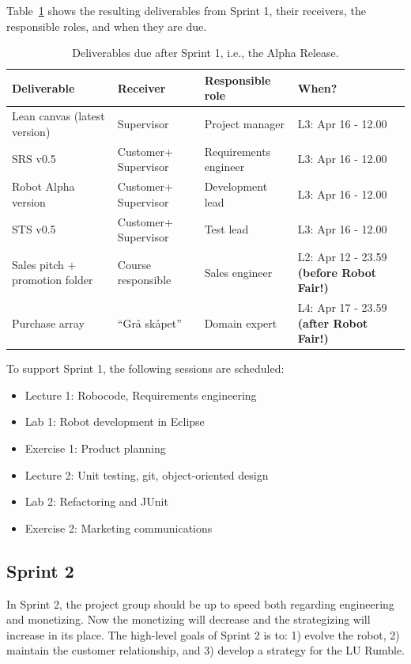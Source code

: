 \documentclass{scrreprt}
\begin{document}
Table~\ref{tab:sprint1} shows the resulting deliverables from Sprint 1, their receivers, the responsible roles, and when they are due.

\begin{table}[]
\centering
\caption{Deliverables due after Sprint 1, i.e., the Alpha Release.}
\label{tab:sprint1}
\begin{tabular}{|p{4cm}|p{2cm}|p{2.5cm}|p{4.5cm}|}
\hline
\textbf{Deliverable}           & \textbf{Receiver}   & \textbf{Responsible role} & \textbf{When?}     \\ \hline
Lean canvas (latest version)   & Supervisor          & Project manager           & L3: Apr 16 - 12.00 \\ \hline
SRS v0.5                       & Customer+ Supervisor & Requirements engineer     & L3: Apr 16 - 12.00 \\ \hline
Robot Alpha version            & Customer+ Supervisor & Development lead          & L3: Apr 16 - 12.00  \\ \hline
STS v0.5        			   & Customer+ Supervisor & Test lead                 & L3: Apr 16 - 12.00  \\ \hline
Sales pitch + promotion folder & Course responsible  & Sales engineer            & L2: Apr 12 - 23.59 \textbf{(before Robot Fair!)}\\ \hline
Purchase array                 & ``Grå skåpet''      & Domain expert             & L4: Apr 17 - 23.59 \textbf{(after Robot Fair!)} \\ \hline
\end{tabular}
\end{table}

\newpage

To support Sprint 1, the following sessions are scheduled:
\begin{itemize}
\item Lecture 1: Robocode, Requirements engineering
\item Lab 1: Robot development in Eclipse
\item Exercise 1: Product planning
\item Lecture 2: Unit testing, git, object-oriented design
\item Lab 2: Refactoring and JUnit
\item Exercise 2: Marketing communications
\end{itemize}

\subsection{Sprint 2}
In Sprint 2, the project group should be up to speed both regarding engineering and monetizing. Now the monetizing will decrease and the strategizing will increase in its place. The high-level goals of Sprint 2 is to: 1) evolve the robot, 2) maintain the customer relationship, and 3) develop a strategy for the LU Rumble.
\end{document}
